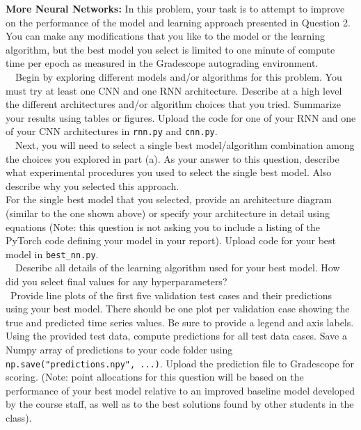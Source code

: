 \documentclass[11pt]{article}
\begin{document}
\begin{problem}{60} \textbf{More Neural Networks:} 
In this problem, your task is to attempt to improve on the performance of the model and learning approach presented in Question 2. You can make any modifications that you like to the model or the learning algorithm, but the best model you select is limited to one minute of compute time per epoch as measured in the Gradescope autograding environment.  \\

~~Begin by exploring different models and/or algorithms for this problem. You must try at least one CNN and one RNN architecture. Describe at a high level the different architectures and/or algorithm choices that you tried. Summarize your results using tables or figures. Upload the code for one of your RNN and one of your CNN architectures in \verb|rnn.py| and \verb|cnn.py|. 
 \\

~~Next, you will need to select a single best model/algorithm combination among the choices you explored in part (a). As your answer to this question, describe what experimental procedures you used to select the single best model. Also describe why you selected this approach. \\

 For the single best model that you selected, provide an architecture diagram (similar to the one shown above) or specify your architecture in detail using equations (Note: this question is not asking you to include a listing of the PyTorch code defining your model in your report). Upload code for your best model in \verb|best_nn.py|.\\

~~Describe all details of the learning algorithm used for your best model. How did you select final values for any hyperparameters?\\  

 ~Provide line plots of the first five validation test cases and their predictions using your best model. There should be one plot per validation case showing the true and predicted time series values. Be sure to provide a legend and axis labels.\\

 Using the provided test data, compute predictions for all test data cases. Save a Numpy array of predictions to your  code folder using \verb|np.save("predictions.npy", ...)|. Upload the prediction file to Gradescope for scoring.  (Note: point allocations for this question will be based on the performance of your best model relative to an improved baseline model developed by the course staff, as well as to the best solutions found by other students in the class). 

\end{problem}

\showpoints
\end{document}
